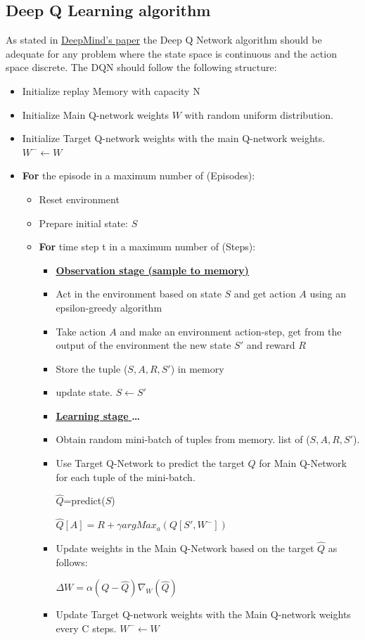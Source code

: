 \subsection{Deep Q Learning algorithm}
\label{sub:DQN}
As stated in \href{https://storage.googleapis.com/deepmind-media/dqn/DQNNaturePaper.pdf}{DeepMind's paper} the Deep Q Network algorithm should be adequate for any problem where the state space is continuous and the action space discrete. The DQN should follow the following structure:
\begin{itemize}
\item Initialize replay Memory with capacity N
\item Initialize Main Q-network weights $W$ with random uniform distribution.
\item Initialize Target Q-network weights with the main Q-network weights. $W^-\leftarrow W$
\item \textbf{For} the episode in a maximum number of (Episodes):
\begin{itemize}
\item Reset environment
\item Prepare initial state: $S$
\item \textbf{For} time step t in a maximum number of (Steps):
\begin{itemize}
\item[] \underline{\textbf{Observation stage (sample to memory)}}
\item Act in the environment based on state $S$ and get action $A$ using an epsilon-greedy algorithm
\item Take action $A$ and make an environment action-step, get from the output of the environment the new state $S'$ and reward $R$
\item Store the tuple ($S,A,R,S'$) in memory
\item update state. $S \leftarrow S'$
\item[] \underline{\textbf{Learning stage }}\textbf{\dots} 
\item Obtain random mini-batch of tuples from memory. list of ($S,A,R,S'$).
\item Use Target Q-Network to predict the target $Q$ for Main Q-Network for each tuple of the mini-batch. 

$\hat{Q}$=predict($S$)

$\hat{Q}[A]=R+\gamma argMax_a(Q[S',W^-])$
\item Update weights in the Main Q-Network based on the target $\hat{Q}$ as follows: 

$\Delta W=\alpha (Q-\hat{Q}) \nabla_W(\hat{Q})$
\item Update Target Q-network weights with the Main Q-network weights every C steps. $W^-\leftarrow W$
\end{itemize}
\end{itemize}
\end{itemize}

